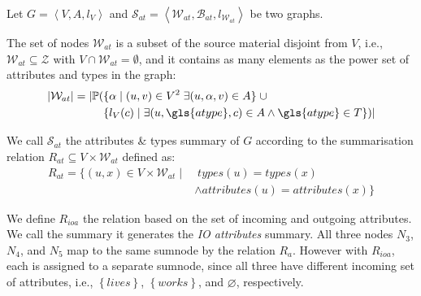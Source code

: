 \begin{definition}
	Let $G=\left\langle V, A, l_V \right\rangle$ and $\mathcal{S}_{at} = \left\langle \mathcal{W}_{at}, \mathcal{B}_{at}, l_{\mathcal{W}_{at}} \right\rangle$ be two graphs.

	The set of nodes $\mathcal{W}_{at}$ is a subset of the source material disjoint from $V$, i.e., $\mathcal{W}_{at} \subseteq \mathcal{Z}$ with $V \cap \mathcal{W}_{at} = \emptyset$, and it contains as many elements as the power set of attributes and types in the graph:
	$$
	\begin{aligned}
	\lvert \mathcal{W}_{at} \rvert = \lvert \mathbb{P} ( & \{ \alpha \mid (u, v) \in V^2\; \exists (u, \alpha, v) \in A \} \;\cup \\
	& \{ l_V(c) \mid \exists (u, \gls{atype}, c) \in A \wedge \gls{atype} \in T \} ) \rvert
	\end{aligned}
	$$

	We call $\mathcal{S}_{at}$ the attributes \& types summary of $G$ according to the summarisation relation $R_{at} \subseteq V \times \mathcal{W}_{at}$ defined as:
	$$
	\begin{aligned}
	R_{at} = \{ (u, x) \in V \times \mathcal{W}_{at} \mid &\; types(u) = types(x) \\
	& \wedge attributes(u) = attributes(x) \}
	\end{aligned}
	$$
	\label{def:at}
\end{definition}


We define $R_{ioa}$ the relation based on the set of incoming and outgoing attributes. We call the summary it generates the \emph{IO attributes} summary.
All three nodes $N_3$, $N_4$, and $N_5$ map to the same sumnode by the relation $R_a$. However with $R_{ioa}$, each is assigned to a separate sumnode, since all three have different incoming set of attributes, i.e., $\left\lbrace lives \right\rbrace$, $\left\lbrace works \right\rbrace$, and $\varnothing$, respectively.

